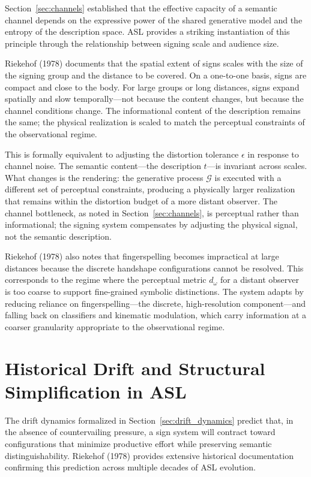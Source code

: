 \documentclass[11pt,a4paper]{article}
\theoremstyle{definition}
\theoremstyle{remark}
\begin{document}
Section~\ref{sec:channels} established that the effective capacity of a semantic channel depends on the expressive power of the shared generative model and the entropy of the description space. ASL provides a striking instantiation of this principle through the relationship between signing scale and audience size.

Riekehof (1978) documents that the spatial extent of signs scales with the size of the signing group and the distance to be covered. On a one-to-one basis, signs are compact and close to the body. For large groups or long distances, signs expand spatially and slow temporally---not because the content changes, but because the channel conditions change. The informational content of the description remains the same; the physical realization is scaled to match the perceptual constraints of the observational regime.

This is formally equivalent to adjusting the distortion tolerance $\epsilon$ in response to channel noise. The semantic content---the description $t$---is invariant across scales. What changes is the rendering: the generative process $\mathcal{G}$ is executed with a different set of perceptual constraints, producing a physically larger realization that remains within the distortion budget of a more distant observer. The channel bottleneck, as noted in Section~\ref{sec:channels}, is perceptual rather than informational; the signing system compensates by adjusting the physical signal, not the semantic description.

Riekehof (1978) also notes that fingerspelling becomes impractical at large distances because the discrete handshape configurations cannot be resolved. This corresponds to the regime where the perceptual metric $d_\omega$ for a distant observer is too coarse to support fine-grained symbolic distinctions. The system adapts by reducing reliance on fingerspelling---the discrete, high-resolution component---and falling back on classifiers and kinematic modulation, which carry information at a coarser granularity appropriate to the observational regime.

\section{Historical Drift and Structural Simplification in ASL}
\label{sec:asl_drift}

The drift dynamics formalized in Section~\ref{sec:drift_dynamics} predict that, in the absence of countervailing pressure, a sign system will contract toward configurations that minimize productive effort while preserving semantic distinguishability. Riekehof (1978) provides extensive historical documentation confirming this prediction across multiple decades of ASL evolution.
\end{document}
